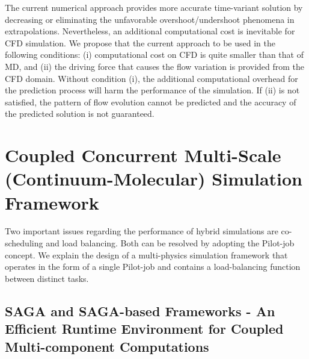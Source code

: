 \documentclass[preprint,12pt]{elsarticle}
\begin{document}
The current numerical approach provides more accurate time-variant solution by decreasing or eliminating the unfavorable overshoot/undershoot phenomena in extrapolations. Nevertheless, an additional computational cost is inevitable for CFD simulation. We propose that the current approach to be used in the following conditions: (i) computational cost on CFD is quite smaller than that of MD, and (ii) the driving force that causes the flow variation is provided from the CFD domain. Without condition (i), the additional computational overhead for the prediction process will harm the performance of the simulation. If (ii) is not satisfied, the pattern of flow evolution cannot be predicted and the accuracy of the predicted solution is not guaranteed.



\section{Coupled Concurrent Multi-Scale (Continuum-Molecular) Simulation Framework}
\label{sec:computational}


Two important issues regarding the performance of hybrid simulations are co-scheduling and load balancing. Both can be resolved by adopting the Pilot-job concept. We explain the design of a multi-physics simulation framework that operates in the form of a single Pilot-job and contains a load-balancing function between distinct tasks.

\subsection{SAGA and SAGA-based Frameworks - An Efficient Runtime Environment for Coupled Multi-component Computations}

\end{document}

